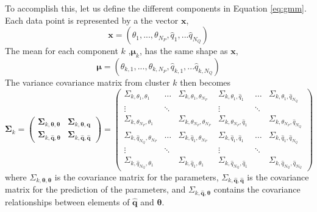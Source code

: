 To accomplish this, let us define the different components in Equation \ref{eq:gmm}.  Each data point is represented by a the vector $\bm{x}$,
\begin{equation}
	\label{eq:gmm_input_vector_all}
        \bm{x} = (\theta_1,...,\theta_{N_P},\hat{q}_1,...\hat{q}_{N_Q})
\end{equation}
The mean for each component $k$ ,$\bm{\mu}_k$, has the same shape as $\bm{x}$,
\begin{equation}
	\label{eq:gmm_output_mean_all}
	\bm{\mu} = (\theta_{k,1},...,\theta_{k,N_P},\hat{q}_{k,1},...\hat{q}_{k,N_Q})
\end{equation}
The variance covariance matrix from cluster $k$ then becomes
\begin{equation}
	\label{eq:gmm_output_mean_all}
	\bm{\Sigma}_k
	=
	\left(
	    \begin{array}{c|c}
		    \bm{\Sigma}_{k,\bm{\theta},\bm{\theta}} & \bm{\Sigma}_{k,\bm{\theta},\bm{q}} \\
		    \hline
		    \bm{\Sigma}_{k,\hat{\bm{q}},\bm{\theta}}     & \bm{\Sigma}_{k,\bm{\hat{q}},\bm{\hat{q}}}
	    \end{array}
       \right)
       =
       \left(
	      \begin{array}{ccc|ccc}
		   \Sigma_{k,\theta_1,\theta_1}  & \dots  & \Sigma_{k,\theta_1,\theta_{N_P}}
		  &\Sigma_{k,\theta_1,\hat{q}_1} & \dots  & \Sigma_{k,\theta_1,\hat{q}_{N_Q}} \\
		   \vdots                        & \ddots &
		  &\vdots                        & \ddots & \\
		   \Sigma_{k,\theta_{N_P},\theta_1} &     & \Sigma_{k,\theta_{N_P},\theta_{N_P}}
		  &\Sigma_{k,\theta_{N_P},\hat{q}_1} &     & \Sigma_{k,\theta_{N_P},\hat{q}_{N_Q}} \\
		\hline
		\Sigma_{k,\hat{q}_{N_Q},\theta_{N_P}}  & \dots  & \Sigma_{k,\hat{q}_1,\theta_{N_P}}
	       &\Sigma_{k,\hat{q}_1,\hat{q}_1} & \dots  & \Sigma_{k,\hat{q}_1,\hat{q}_{N_Q}} \\
		\vdots                        & \ddots &
	       &\vdots                        & \ddots & \\
		\Sigma_{k,\hat{q}_{N_Q},\theta_1} &     & \Sigma_{k,\hat{q}_1,\theta_1}
	       &\Sigma_{k,\hat{q}_{N_Q},\hat{q}_1} &     & \Sigma_{k,\hat{q}_{N_Q},\hat{q}_{N_Q}}
	      \end{array}
       \right)
\end{equation}
where
$\Sigma_{k,\bm{\theta}, \bm{\theta}}$ is the covariance matrix for the parameters,
$\Sigma_{k,\hat{\bm{q}}, \hat{\bm{q}}}$ is the covariance matrix for the prediction of the parameters, and
$\Sigma_{k,\hat{\bm{q}}, \bm{\theta}}$ contains the covariance relationships between elements of $\hat{\bm{q}}$ and $\bm{\theta}$.

